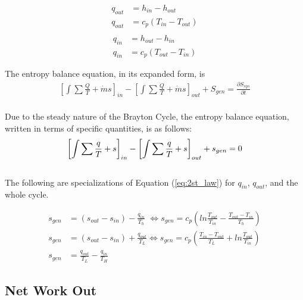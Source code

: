 \documentclass[
	12pt, %
]{brayton_cycle_report_style}
\begin{document}
\begin{multicols}{2}
  \begin{align*}
    q_{out} &= h_{in} - h_{out} \\
    q_{out} &= c_{p}\left(T_{in} - T_{out}\right) \\
  \end{align*}
  \vspace{1mm}
  \begin{align*}
    q_{in} &= h_{out} - h_{in} \\
    q_{in} &= c_{p}(T_{out} - T_{in})  
  \end{align*}
\end{multicols}

\vspace{-5mm}

\noindent The entropy balance equation, in its expanded form, is
\begin{align*}
   \left[\int\sum \frac{Q}{T} + \dot{m}s \right]_{in} - \left[\int\sum \frac{Q}{T} + \dot{m}s \right]_{out} + S_{gen} = \frac{\partial S_{sys}}{\partial t}
\end{align*}
\\
\noindent Due to the steady nature of the Brayton Cycle, the entropy balance equation, written in terms of specific quantities, is as follows:
\begin{equation}
   \left[\int\sum \frac{q}{T} + s \right]_{in} - \left[\int\sum \frac{q}{T} + s \right]_{out} + s_{gen} = 0
       \label{eq:2st_law} \\
\end{equation}
\\
\noindent The following are specializations of Equation (\ref{eq:2st_law}) for $q_{in}$, $q_{out}$, and the whole cycle.


\begin{align*}
    s_{gen} &= \left(s_{out}-s_{in} \right) - \frac{q_{in}}{T_{h}} \,\, \iff  s_{gen} =  c_{p}\left(ln\frac{T_{out}}{T_{in}} - \frac{T_{out}-T_{in}}{T_{h}} \right)\\     
    s_{gen} &= \left(s_{out}-s_{in}\right) + \frac{q_{out}}{T_{L}}      \iff  s_{gen} = c_{p} \left(\frac{T_{in} - T_{out}}{T_{L}} + ln\frac{T_{out}}{T_{in}} \right) \\
    s_{gen} &= \frac{q_{out}}{T_{L}} - \frac{q_{in}}{T_{H}} 
\end{align*}
\subsection{Net Work Out}
\end{document}
